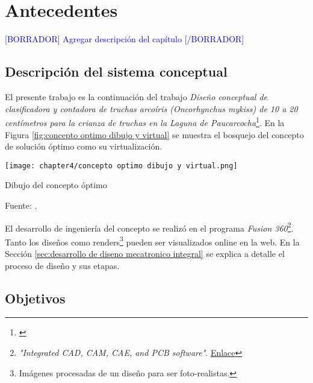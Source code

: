 
\pagestyle{myportland}
\doublespacing
\chapter[\quad\quad\quad\quad ----- Antecedentes]{\\ Antecedentes}
\thispagestyle{myportland}

\textcolor{blue}{[BORRADOR] Agregar descripción del capítulo [/BORRADOR]} 

\section{Descripción del sistema conceptual}

El presente trabajo es la continuación del trabajo \textit{Diseño conceptual de clasificadora y contadora de truchas arcoíris (Oncorhynchus mykiss) de 10 a 20 centímetros para la crianza de truchas en la Laguna de Paucarcocha}\footnote{\cite{DiazVergara2020}}. En la Figura \ref{fig:concepto optimo dibujo y virtual} se muestra el bosquejo del concepto de solución óptimo como su virtualización.

\begin{myfigure}[H]
	\centering
	\texttt{[image: chapter4/concepto optimo dibujo y virtual.png]}
	\caption{Dibujo del concepto óptimo}
	\begin{myflushcenter}
		Fuente: \cite{DiazVergara2020}.
	\end{myflushcenter}
	\label{fig:concepto optimo dibujo y virtual}
\end{myfigure}

El desarrollo de ingeniería del concepto se realizó en el programa \textit{Fusion 360}\footnote{\textit{"Integrated CAD, CAM, CAE, and PCB software"}. \href{https://www.autodesk.com/products/fusion-360/overview}{Enlace}}. Tanto los diseños como renders\footnote{Imágenes procesadas de un diseño para ser foto-realistas.} pueden ser visualizados online en la web. En la Sección \ref{sec:desarrollo de diseno mecatronico integral} se explica a detalle el proceso de diseño y sus etapas.

\section{Objetivos}

